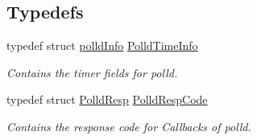 \subsection*{Typedefs}
\begin{DoxyCompactItemize}
\item 
\hypertarget{group__SYSFRAMEWORK__POLLD_gaac3d35d6a6150660580f1c201baf5ca9}{typedef struct \hyperlink{structpolldInfo}{polld\-Info} \hyperlink{group__SYSFRAMEWORK__POLLD_gaac3d35d6a6150660580f1c201baf5ca9}{Polld\-Time\-Info}}\label{group__SYSFRAMEWORK__POLLD_gaac3d35d6a6150660580f1c201baf5ca9}

\begin{DoxyCompactList}\small\item\em Contains the timer fields for polld. \end{DoxyCompactList}\item 
\hypertarget{group__SYSFRAMEWORK__POLLD_gab66601607b9776a27d87bcfc0b024b6f}{typedef struct \hyperlink{structPolldResp}{Polld\-Resp} \hyperlink{group__SYSFRAMEWORK__POLLD_gab66601607b9776a27d87bcfc0b024b6f}{Polld\-Resp\-Code}}\label{group__SYSFRAMEWORK__POLLD_gab66601607b9776a27d87bcfc0b024b6f}

\begin{DoxyCompactList}\small\item\em Contains the response code for Callbacks of polld. \end{DoxyCompactList}\end{DoxyCompactItemize}
